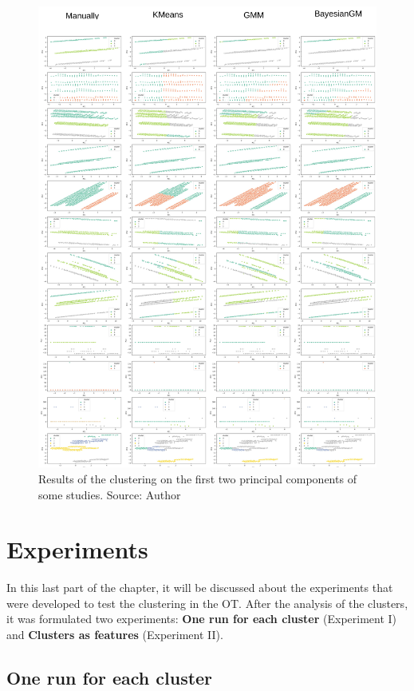 \begin{figure}[H]
   \centering
   \includegraphics[width=\linewidth]{fig/ch3-clustering-studies.png}
   \caption{Results of the clustering on the first two principal components of some studies. Source: Author}
   \label{fig:clustering-studies}
\end{figure}

\section{Experiments}

In this last part of the chapter, it will be discussed about the experiments that were developed to test the clustering in the OT. After the analysis of the clusters, it was formulated two experiments: \textbf{One run for each cluster} (Experiment I) and \textbf{Clusters as features} (Experiment II).

\subsection{One run for each cluster}

